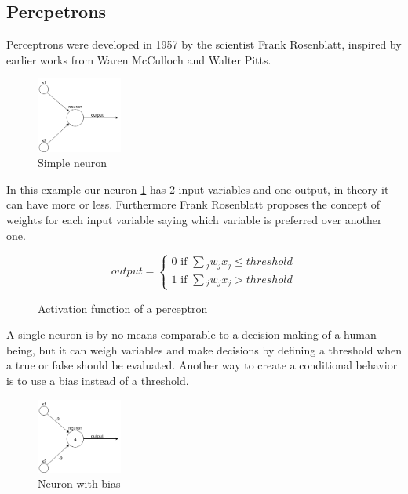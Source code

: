 \subsection{Percpetrons}
Perceptrons were developed in 1957 by the scientist Frank Rosenblatt, inspired by earlier works from Waren McCulloch and Walter
Pitts.\cite{neuralnetworksanddeeplearning}
\vspace{0.25cm}
\begin{figure}[H]
    \caption{Simple neuron}
    \begin{center}
        \includegraphics[width=0.25\textwidth]{images/neurons/simple_neuron.png}
    \end{center}
    \label{fig:simple-neuron}
\end{figure}
\vspace{0.25cm} \noindent
In this example our neuron \ref{fig:simple-neuron} has 2 input variables and one output, in theory it can have more or less. Furthermore Frank Rosenblatt proposes
the concept of weights for each input variable saying which variable is preferred over another one.
\vspace{0.25cm} 
\begin{figure}[H]
    \caption{Activation function of a perceptron}
    \begin{equation*}
        output=
        \begin{cases}
            0 \text{ if } \sum{_j}{w_jx_j \le threshold}\\
            1 \text{ if } \sum{_j}{w_jx_j > threshold}
        \end{cases}
    \end{equation*}
\end{figure}
\vspace{0.25cm} \noindent
A single neuron is by no means comparable to a decision making of a human being, but it can weigh variables and make decisions
by defining a threshold when a true or false should be evaluated. Another way to create a conditional behavior is to use a bias
instead of a threshold.
\vspace{0.25cm}
\begin{figure}[H]
    \caption{Neuron with bias}
    \begin{center}
        \includegraphics[width=0.25\textwidth]{images/neurons/simple_neuron_bias.png}
    \end{center} 
\end{figure}
